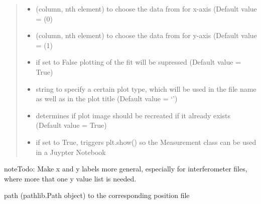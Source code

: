 \documentclass[letterpaper,10pt,english]{sphinxmanual}
\begin{document}
\begin{fulllineitems}
\begin{fulllineitems}
\begin{quote}
\begin{description}
\begin{itemize}
\item {} 
 \textendash{} (column, nth element) to choose the data from for x-axis (Default value = (0)

\item {} 
 \textendash{} (column, nth element) to choose the data from for y-axis (Default value = (1)

\item {} 
 \textendash{} if set to False plotting of the fit will be supressed (Default value = True)

\item {} 
 \textendash{} string to specify a certain plot type, which will be used
in the file name as well as in the plot title (Default value = ‘’)

\item {} 
 \textendash{} determines if plot image should be recreated if it already exists (Default value = True)

\item {} 
 \textendash{} if set to True, triggers plt.show() so the Measurement class can be used in a Juypter Notebook

\end{itemize}

\end{description}\end{quote}

\begin{sphinxadmonition}{note}{\label{measurement:index-5}Todo:}
Make x and y labels more general, especially for interferometer files, where more that one y value list is needed.
\end{sphinxadmonition}

\end{fulllineitems}


\begin{fulllineitems}
\label{\detokenize{measurement:measurement.Measurement.pos_file_path}}
path (pathlib.Path object) to the corresponding position file


\end{fulllineitems}
\end{fulllineitems}
\end{document}
